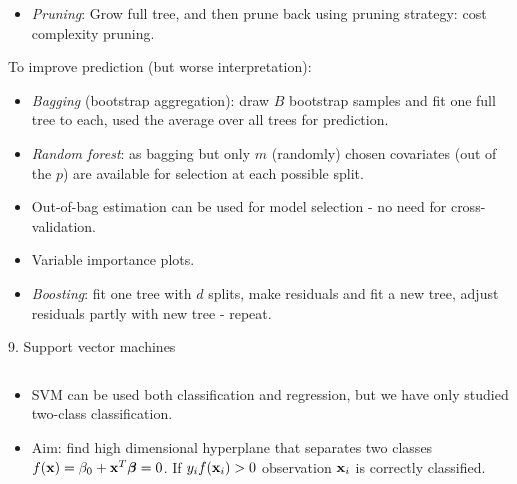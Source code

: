 \documentclass[10pt,ignorenonframetext,]{beamer}
\providecommand{\tightlist}{%
  \setlength{\itemsep}{0pt}\setlength{\parskip}{0pt}}
\begin{document}
\begin{frame}

\begin{itemize}
\tightlist
\item
  \emph{Pruning}: Grow full tree, and then prune back using pruning
  strategy: cost complexity pruning.
\end{itemize}

To improve prediction (but worse interpretation):

\begin{itemize}
\item
  \emph{Bagging} (bootstrap aggregation): draw \(B\) bootstrap samples
  and fit one full tree to each, used the average over all trees for
  prediction.
\item
  \emph{Random forest}: as bagging but only \(m\) (randomly) chosen
  covariates (out of the \(p\)) are available for selection at each
  possible split.
\item
  Out-of-bag estimation can be used for model selection - no need for
  cross-validation.
\item
  Variable importance plots.
\item
  \emph{Boosting}: fit one tree with \(d\) splits, make residuals and
  fit a new tree, adjust residuals partly with new tree - repeat.
\end{itemize}

\end{frame}

\begin{frame}

\begin{block}{9. Support vector machines}

\(~\)

\begin{itemize}
\tightlist
\item
  SVM can be used both classification and regression, but we have only
  studied two-class classification.
\end{itemize}

\vspace{2mm}

\begin{itemize}
\tightlist
\item
  Aim: find high dimensional hyperplane that separates two classes
  \(f({\bf x})=\beta_0+{\bf x}^T \boldsymbol\beta=0\). If
  \(y_if({\bf x}_i)>0\) observation \({\bf x}_i\) is correctly
  classified.
\end{itemize}

\vspace{2mm}

\end{block}

\end{frame}
\end{document}
